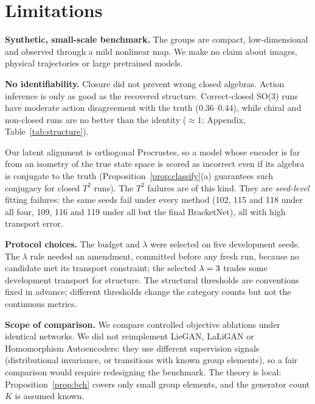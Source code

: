 \section{Limitations}\label{sec:limits}
\textbf{Synthetic, small-scale benchmark.} The groups are compact, low-dimensional and observed through a mild
nonlinear map. We make no claim about images, physical trajectories or large pretrained models.

\textbf{No identifiability.} Closure did not prevent wrong closed algebras. Action inference is only as good as
the recovered structure. Correct-closed SO(3) runs have moderate action disagreement with the truth
($0.36$--$0.44$), while chiral and non-closed runs are no better than the identity ($\approx1$; Appendix,
Table~\ref{tab:structure}).

Our latent alignment is orthogonal Procrustes, so a model whose encoder is far from an isometry of the true state
space is scored as incorrect even if its algebra is conjugate to the truth (Proposition~\ref{prop:classify}(a)
guarantees such conjugacy for closed $T^2$ runs). The $T^2$ failures are of this kind. They are \emph{seed-level}
fitting failures: the same seeds fail under every method (102, 115 and 118 under all four, 109, 116 and 119 under
all but the final BracketNet), all with high transport error.

\textbf{Protocol choices.} The budget and $\lambda$ were selected on five development seeds. The $\lambda$ rule
needed an amendment, committed before any fresh run, because no candidate met its transport constraint; the
selected $\lambda=3$ trades some development transport for structure. The structural thresholds are
conventions fixed in advance; different thresholds change the category counts but not the continuous metrics.

\textbf{Scope of comparison.} We compare controlled objective ablations under identical networks. We did not
reimplement LieGAN, LaLiGAN or Homomorphism Autoencoders: they use different supervision signals (distributional
invariance, or transitions with known group elements), so a fair comparison would require redesigning the
benchmark. The theory is local: Proposition~\ref{prop:bch} covers only small group elements, and the generator
count $K$ is assumed known.

